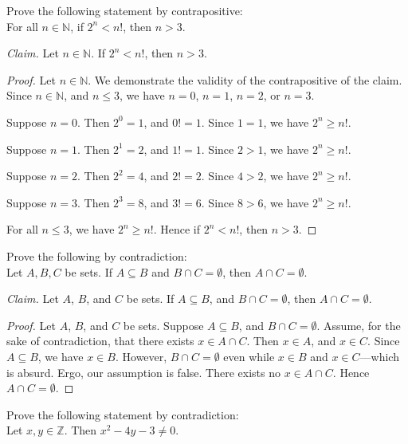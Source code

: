 \documentclass{article}
\newcommand{\Z}{\mathbb{Z}}
\theoremstyle{definition}
\begin{document}
\begin{question}
    Prove the following statement by contrapositive: \\
    For all $n\in \mathbb{N}$, if $2^n<n!$, then $n>3$.
\end{question}
\begin{solution}
\newline

\noindent\textit{Claim. }Let $n\in\mathbb{N}$. If $2^n<n!$, then $n>3$.
\begin{proof}
Let $n\in\mathbb{N}$. We demonstrate the validity of the contrapositive of the claim. Since $n\in\mathbb{N}$, and $n\leq 3$, we have $n=0$, $n=1$, $n=2$, or $n=3$.

\noindent Suppose $n=0$. Then $2^0=1$, and $0!=1$. Since $1=1$, we have $2^n\geq n!$.

\noindent Suppose $n=1$. Then $2^1=2$, and $1!=1$. Since $2>1$, we have $2^n\geq n!$.

\noindent Suppose $n=2$. Then $2^2=4$, and $2!=2$. Since $4>2$, we have $2^n\geq n!$.

\noindent Suppose $n=3$. Then $2^3=8$, and $3!=6$. Since $8>6$, we have $2^n\geq n!$.

\noindent For all $n\leq 3$, we have $2^n\geq n!$. Hence if $2^n<n!$, then $n>3$.
\end{proof}
\end{solution}
\begin{question}
    Prove the following by contradiction:\\
    Let $A, B, C$ be sets. If $A\subseteq B$ and $B\cap C=\emptyset$, then $A\cap C=\emptyset$.
\end{question}
\begin{solution}
\newline

\noindent\textit{Claim. }Let $A$, $B$, and $C$ be sets. If $A\subseteq B$, and $B\cap C=\emptyset$, then $A\cap C=\emptyset$.
\begin{proof}
Let $A$, $B$, and $C$ be sets. Suppose $A\subseteq B$, and $B\cap C=\emptyset$. Assume, for the sake of contradiction, that there exists $x\in A\cap C$. Then $x\in A$, and $x\in C$. Since $A\subseteq B$, we have $x\in B$. However, $B\cap C=\emptyset$ even while $x\in B$ and $x\in C$---which is absurd. Ergo, our assumption is false. There exists no $x\in A\cap C$. Hence $A\cap C=\emptyset$.
\end{proof}
\end{solution}
\begin{question}
    Prove the following statement by contradiction:\\
    Let $x, y\in \Z$. Then $x^2-4y-3\neq 0$.
\end{question}
\end{document}
